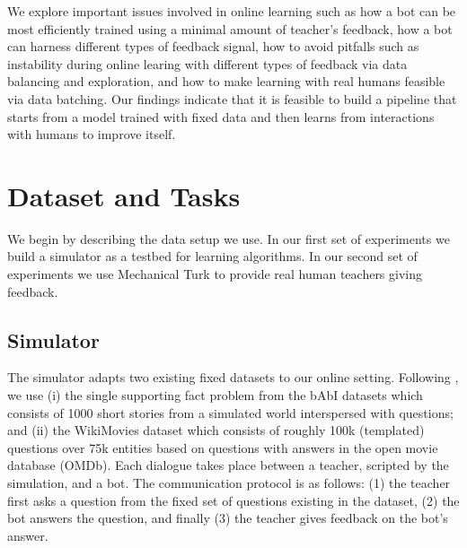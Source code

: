     We explore  important issues involved in online learning
   such as  how a bot can be most efficiently trained using a minimal amount of teacher's feedback,
 how a bot can harness different types of feedback signal,
how to avoid pitfalls such as instability during online learing with different types of feedback via
 data balancing and exploration,
and how to make learning with real humans feasible via data batching.
Our findings indicate that
it is feasible to build a pipeline
that starts from a model trained with fixed data and then learns from interactions with humans
to improve itself. %




\section{Dataset and Tasks}

We begin by describing the data setup we use.
In our first set of experiments we build a simulator as a testbed for learning algorithms.
In our second set of experiments we use Mechanical Turk to provide real human teachers giving feedback.


\subsection{Simulator}

The simulator adapts two existing fixed datasets to our online setting.
Following , we use
(i) the single supporting fact problem from the bAbI datasets \cite{weston2015towards}
which consists of 1000 short stories from a simulated world interspersed with questions; and (ii)
the WikiMovies dataset \cite{weston2015towards} which consists
 of roughly 100k (templated) questions
over 75k entities based on questions with answers in the open movie database (OMDb).
Each dialogue takes place between a teacher, scripted by the simulation, and a bot.
The communication protocol is as follows: (1)
the teacher first asks a question from the fixed set of questions existing in the dataset, (2)
the bot answers the question, and finally (3) the teacher gives feedback on the bot's answer.

